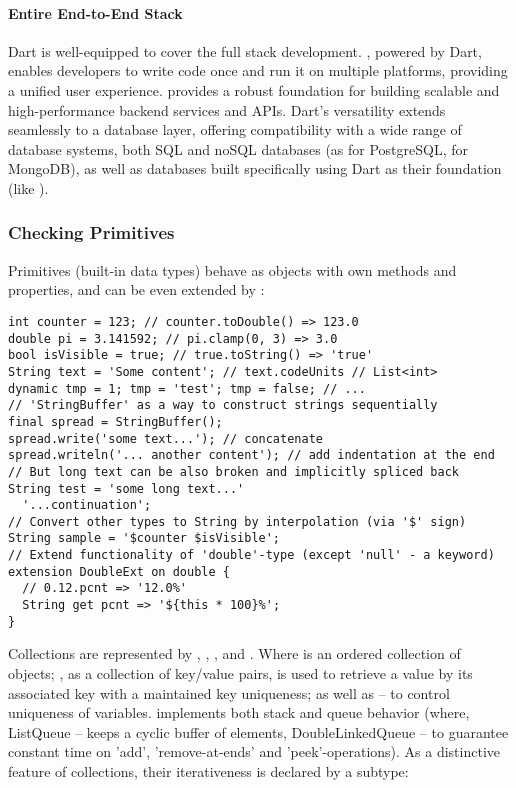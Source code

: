 \paragraph{Entire End-to-End Stack}

Dart is well-equipped to cover the full stack development. , powered by Dart, enables developers to write 
code once and run it on multiple platforms, providing a unified user experience.  provides a robust 
foundation for building scalable and high-performance backend services and APIs. Dart's versatility extends 
seamlessly to a database layer, offering compatibility with a wide range of database systems, both SQL and 
noSQL databases (as  for PostgreSQL,  for MongoDB), as well as databases built specifically 
using Dart as their foundation (like ).


\newpage
\subsubsection{Checking Primitives} \label{dart-prim}

Primitives (built-in data types) behave as objects with own methods and properties, and can be even extended 
by :

\begin{lstlisting}
int counter = 123; // counter.toDouble() => 123.0
double pi = 3.141592; // pi.clamp(0, 3) => 3.0
bool isVisible = true; // true.toString() => 'true'
String text = 'Some content'; // text.codeUnits // List<int>
dynamic tmp = 1; tmp = 'test'; tmp = false; // ...
// 'StringBuffer' as a way to construct strings sequentially
final spread = StringBuffer();
spread.write('some text...'); // concatenate
spread.writeln('... another content'); // add indentation at the end
// But long text can be also broken and implicitly spliced back
String test = 'some long text...'
  '...continuation';
// Convert other types to String by interpolation (via '$' sign)
String sample = '$counter $isVisible';
// Extend functionality of 'double'-type (except 'null' - a keyword)
extension DoubleExt on double {
  // 0.12.pcnt => '12.0%'
  String get pcnt => '${this * 100}%';
}
\end{lstlisting}

\noindent Collections are represented by , , , and . Where  is an ordered 
collection of objects; , as a collection of key/value pairs, is used to retrieve a value by its associated key 
with a maintained key uniqueness; as well as  -- to control uniqueness of variables.  implements both 
stack and queue behavior (where, ListQueue -- keeps a cyclic buffer of elements, DoubleLinkedQueue -- to guarantee 
constant time on 'add', 'remove-at-ends' and 'peek'-operations). As a distinctive feature of collections, their 
iterativeness is declared by a subtype:

